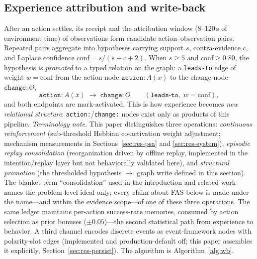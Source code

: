 \documentclass[10pt]{article}
\begin{document}
\subsection{Experience attribution and write-back}
\label{sec:arch-wb}
After an action settles, its receipt and the attribution window (8--120\,s of environment time) of observations form candidate action--observation pairs. Repeated pairs aggregate into hypotheses carrying support $s$, contra-evidence $c$, and Laplace confidence $\mathrm{conf}=s/(s+c+2)$. When $s\ge 5$ and $\mathrm{conf}\ge 0.80$, the hypothesis is \emph{promoted} to a typed relation on the graph: a \texttt{leads-to} edge of weight $w=\mathrm{conf}$ from the action node $\mathtt{action:}A(x)$ to the change node $\mathtt{change:}O$,
\begin{equation}
\mathtt{action:}A(x) \;\longrightarrow\; \mathtt{change:}O \qquad (\texttt{leads-to},\; w{=}\mathrm{conf}),
\label{eq:wb}
\end{equation}
and both endpoints are mark-activated. This is how experience becomes \emph{new relational structure}: \texttt{action:}/\texttt{change:} nodes exist only as products of this pipeline. \emph{Terminology note.} This paper distinguishes three operations: \emph{continuous reinforcement} (sub-threshold Hebbian co-activation weight adjustment; mechanism measurements in Sections~\ref{sec:res-psa} and \ref{sec:res-system}), \emph{episodic replay consolidation} (reorganization driven by offline replay, implemented in the intention/replay layer but not behaviorally validated here), and \emph{structural promotion} (the thresholded hypothesis $\rightarrow$ graph write defined in this section). The blanket term ``consolidation'' used in the introduction and related work names the problem-level ideal only; every claim about FAS below is made under the name---and within the evidence scope---of one of these three operations. The same ledger maintains per-action success-rate memories, consumed by action selection as prior bonuses ($\pm0.05$)---the second statistical path from experience to behavior. A third channel encodes discrete events as event-framework nodes with polarity-slot edges (implemented and production-default off; this paper assembles it explicitly, Section~\ref{sec:res-persist}). The algorithm is Algorithm~\ref{alg:wb}.
\end{document}
